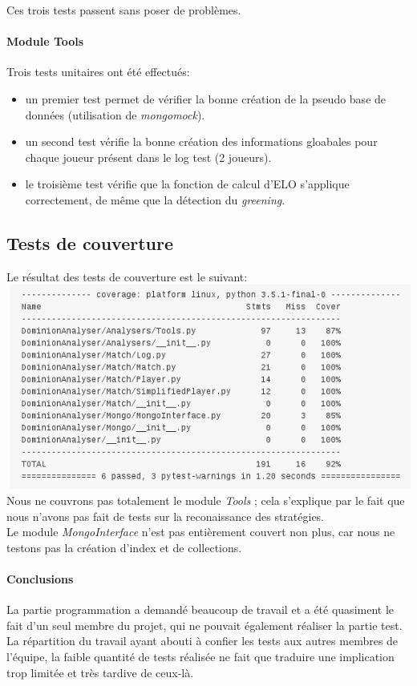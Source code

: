 Ces trois tests passent sans poser de problèmes.

\paragraph{Module Tools}
Trois tests unitaires ont été effectués:
\begin{itemize}
\item un premier test permet de vérifier la bonne création de la pseudo base de données (utilisation de \textit{mongomock}).
\item un second test vérifie la bonne création des informations gloabales pour chaque joueur présent dans le log test (2 joueurs).
\item le troisième test vérifie que la fonction de calcul d'ELO s'applique correctement, de même que la détection du \textit{greening}.
\end{itemize}

\subsection{Tests de couverture}
Le résultat des tests de couverture est le suivant:\\
\includegraphics[width=\textwidth,height=\textheight,keepaspectratio]{./coverage_python_code}
Nous ne couvrons pas totalement le module \textit{Tools} ; cela s'explique par le fait que nous n'avons pas fait de tests sur la reconaissance des stratégies.\\
Le module \textit{MongoInterface} n'est pas entièrement couvert non plus, car nous ne testons pas la création d'index et de collections.


\paragraph{Conclusions}
La partie programmation a demandé beaucoup de travail et a été quasiment le fait d'un seul membre du projet, qui ne pouvait également réaliser la partie test. La répartition du travail ayant abouti à confier les tests aux autres membres de l'équipe, la faible quantité de tests réalisée ne fait que traduire une implication trop limitée et très tardive de ceux-là.


